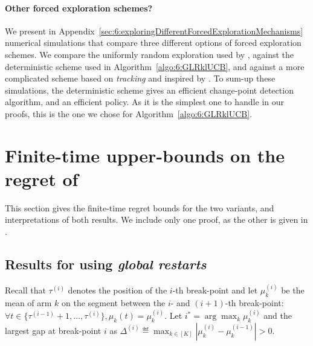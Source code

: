 \paragraph{Other forced exploration schemes?}
%
We present in Appendix~\ref{sec:6:exploringDifferentForcedExplorationMechanisms} numerical simulations that compare three different options of forced exploration schemes.
We compare the uniformly random exploration used by \CUSUMUCB, against the deterministic scheme used in Algorithm~\ref{algo:6:GLRklUCB}, and against a more complicated scheme based on \emph{tracking} and inspired by \cite{Garivier16BAI}.
To sum-up these simulations, the deterministic scheme gives an efficient change-point detection algorithm, and an efficient \GLRklUCB{} policy.
As it is the simplest one to handle in our proofs, this is the one we chose for Algorithm~\ref{algo:6:GLRklUCB}.



\section{Finite-time upper-bounds on the regret of \GLRklUCB}
\label{sec:6:RegretAnalysis}

This section gives the finite-time regret bounds for the two variants, and interpretations of both results.
We include only one proof, as the other is given in \cite{Besson2019GLRT}.

\subsection{Results for \GLRklUCB{} using \emph{global restarts}}

Recall that $\tau^{(i)}$ denotes the position of the $i$-th break-point and let $\mu_k^{(i)}$ be the mean of arm $k$ on the segment between the $i$- and $(i+1)$-th break-point:
$\forall t \in \{ \tau^{(i-1)}+1, \dots, \tau^{(i)} \}, \mu_k(t) = \mu_k^{(i)}$.
Let $i^* = \arg\max_k \mu_k^{(i)} $ and the largest gap at break-point $i$ as $\Delta^{(i)} \eqdef \max_{k\in[K]} |\mu_k^{(i)} - \mu_k^{(i-1)}| >0$.


